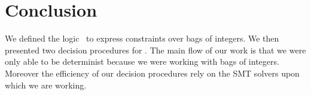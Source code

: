 
\section{Conclusion}

We defined the logic \QFBILIA\ to express constraints over bags of integers. 
We then presented two decision procedures for \QFBILIA. 
The main flow of our work is that we were only able to be determinist because we were working with bags of integers.
Moreover the efficiency of our decision procedures rely on the SMT solvers upon which we are working.
